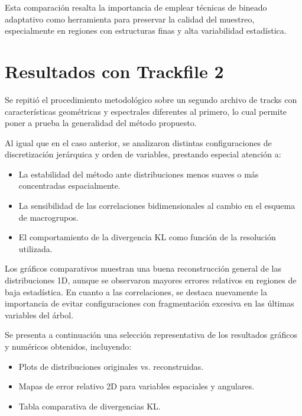 Esta comparación resalta la importancia de emplear técnicas de bineado adaptativo como herramienta para preservar la calidad del muestreo, especialmente en regiones con estructuras finas y alta variabilidad estadística.

\section{Resultados con Trackfile 2}
\label{sec:resultados-track2}

Se repitió el procedimiento metodológico sobre un segundo archivo de tracks con características geométricas y espectrales diferentes al primero, lo cual permite poner a prueba la generalidad del método propuesto.

Al igual que en el caso anterior, se analizaron distintas configuraciones de discretización jerárquica y orden de variables, prestando especial atención a:

\begin{itemize}
    \item La estabilidad del método ante distribuciones menos suaves o más concentradas espacialmente.
    \item La sensibilidad de las correlaciones bidimensionales al cambio en el esquema de macrogrupos.
    \item El comportamiento de la divergencia KL como función de la resolución utilizada.
\end{itemize}

Los gráficos comparativos muestran una buena reconstrucción general de las distribuciones 1D, aunque se observaron mayores errores relativos en regiones de baja estadística. En cuanto a las correlaciones, se destaca nuevamente la importancia de evitar configuraciones con fragmentación excesiva en las últimas variables del árbol.

Se presenta a continuación una selección representativa de los resultados gráficos y numéricos obtenidos, incluyendo:

\begin{itemize}
    \item Plots de distribuciones originales vs. reconstruidas.
    \item Mapas de error relativo 2D para variables espaciales y angulares.
    \item Tabla comparativa de divergencias KL.
\end{itemize}

